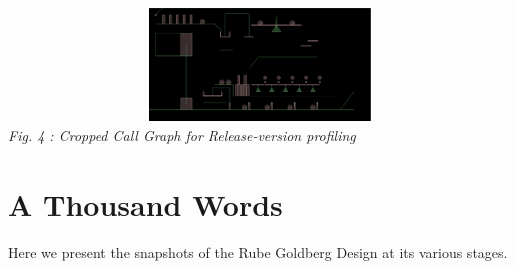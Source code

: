 \documentclass[a4paper,11pt]{article}
\begin{document}
\begin{center}
\includegraphics[width=195mm, height=30mm]{state_00.eps}\\
\emph{Fig. 4 : Cropped Call Graph for Release-version profiling}
\end{center}





\section{A Thousand Words}

Here we present the snapshots of the Rube Goldberg Design at its various stages.
\end{document}
